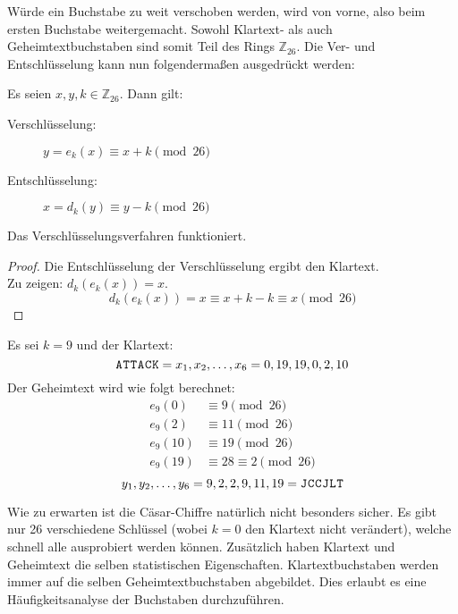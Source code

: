 \noindent
Würde ein Buchstabe zu weit verschoben werden, wird von vorne,
also beim ersten Buchstabe weitergemacht.
Sowohl Klartext- als auch Geheimtextbuchstaben sind somit Teil des Rings $\mathbb{Z}_{26}$.
Die Ver- und Entschlüsselung kann nun folgendermaßen ausgedrückt werden:

\begin{definition}
  Es seien $x,y,k \in \mathbb{Z}_{26}$. Dann gilt:
  \begin{description}
    \item[Verschlüsselung:] $y = e_k(x) \equiv x + k \pmod{26}$
    \item[Entschlüsselung:] $x = d_k(y) \equiv y - k \pmod{26}$
  \end{description}
\end{definition}

\newpage
\noindent
Das Verschlüsselungsverfahren funktioniert.
\begin{proof}
  Die Entschlüsselung der Verschlüsselung ergibt den Klartext. \\
  Zu zeigen: $d_k(e_k(x)) = x$.
  \begin{equation*}
    d_k(e_k(x)) = x \equiv x + k - k \equiv x \pmod{26}
  \end{equation*}
\end{proof}
\begin{example}
  Es sei $k = 9$ und der Klartext:
  \begin{equation*}
    \text{\texttt{A\kern 0.2mmT\kern 0.2mmT\kern 0.2mmA\kern 0.2mmC\kern 0.2mmK}}
    = x_1,x_2,\dots,x_6 = 0,19,19,0,2,10
  \end{equation*}
  Der Geheimtext wird wie folgt berechnet:
  \begin{align*}
    e_9(0)  & \equiv 9 \pmod{26}           \\
    e_9(2)  & \equiv 11 \pmod{26}          \\
    e_9(10) & \equiv 19 \pmod{26}          \\
    e_9(19) & \equiv 28 \equiv 2 \pmod{26}
  \end{align*}
  \begin{equation*}
    y_1,y_2,\dots,y_6 = 9,2,2,9,11,19 =
    \text{\texttt{J\kern 0.2mmC\kern 0.2mmC\kern 0.2mmJ\kern 0.2mmL\kern 0.2mmT}}
  \end{equation*}
\end{example}

\noindent
Wie zu erwarten ist die Cäsar-Chiffre natürlich nicht besonders sicher.
Es gibt nur 26 verschiedene Schlüssel (wobei $k = 0$ den Klartext nicht verändert),
welche schnell alle ausprobiert werden können. Zusätzlich
haben Klartext und Geheimtext die selben statistischen Eigenschaften.
Klartextbuchstaben werden immer auf die selben Geheimtextbuchstaben abgebildet. Dies
erlaubt es eine Häufigkeitsanalyse der Buchstaben durchzuführen.